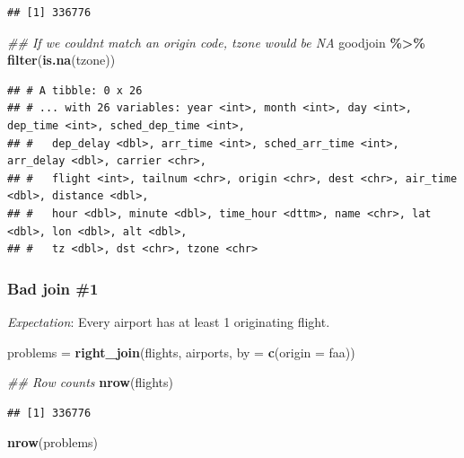 \documentclass[
]{article}
\newenvironment{Shaded}{\begin{snugshade}}{\end{snugshade}}
\newcommand{\CommentTok}[1]{\textcolor[rgb]{0.56,0.35,0.01}{\textit{#1}}}
\newcommand{\DataTypeTok}[1]{\textcolor[rgb]{0.13,0.29,0.53}{#1}}
\newcommand{\KeywordTok}[1]{\textcolor[rgb]{0.13,0.29,0.53}{\textbf{#1}}}
\newcommand{\NormalTok}[1]{#1}
\newcommand{\OperatorTok}[1]{\textcolor[rgb]{0.81,0.36,0.00}{\textbf{#1}}}
\newcommand{\StringTok}[1]{\textcolor[rgb]{0.31,0.60,0.02}{#1}}
\begin{document}
\begin{verbatim}
## [1] 336776
\end{verbatim}

\begin{Shaded}
\begin{Highlighting}[]
\CommentTok{\#\# If we couldn\textquotesingle{}t match an origin code, \textasciigrave{}tzone\textasciigrave{} would be NA}
\NormalTok{goodjoin }\OperatorTok{\%\textgreater{}\%}\StringTok{ }
\StringTok{    }\KeywordTok{filter}\NormalTok{(}\KeywordTok{is.na}\NormalTok{(tzone))}
\end{Highlighting}
\end{Shaded}

\begin{verbatim}
## # A tibble: 0 x 26
## # ... with 26 variables: year <int>, month <int>, day <int>, dep_time <int>, sched_dep_time <int>,
## #   dep_delay <dbl>, arr_time <int>, sched_arr_time <int>, arr_delay <dbl>, carrier <chr>,
## #   flight <int>, tailnum <chr>, origin <chr>, dest <chr>, air_time <dbl>, distance <dbl>,
## #   hour <dbl>, minute <dbl>, time_hour <dttm>, name <chr>, lat <dbl>, lon <dbl>, alt <dbl>,
## #   tz <dbl>, dst <chr>, tzone <chr>
\end{verbatim}

\hypertarget{bad-join-1}{%
\subsubsection{Bad join \#1}\label{bad-join-1}}

\emph{Expectation}: Every airport has at least 1 originating flight.

\begin{Shaded}
\begin{Highlighting}[]
\NormalTok{problems =}\StringTok{ }\KeywordTok{right\_join}\NormalTok{(flights, airports, }\DataTypeTok{by =} \KeywordTok{c}\NormalTok{(}\StringTok{\textquotesingle{}origin\textquotesingle{}}\NormalTok{ =}\StringTok{ \textquotesingle{}faa\textquotesingle{}}\NormalTok{))}

\CommentTok{\#\# Row counts}
\KeywordTok{nrow}\NormalTok{(flights)}
\end{Highlighting}
\end{Shaded}

\begin{verbatim}
## [1] 336776
\end{verbatim}

\begin{Shaded}
\begin{Highlighting}[]
\KeywordTok{nrow}\NormalTok{(problems)}
\end{Highlighting}
\end{Shaded}
\end{document}
